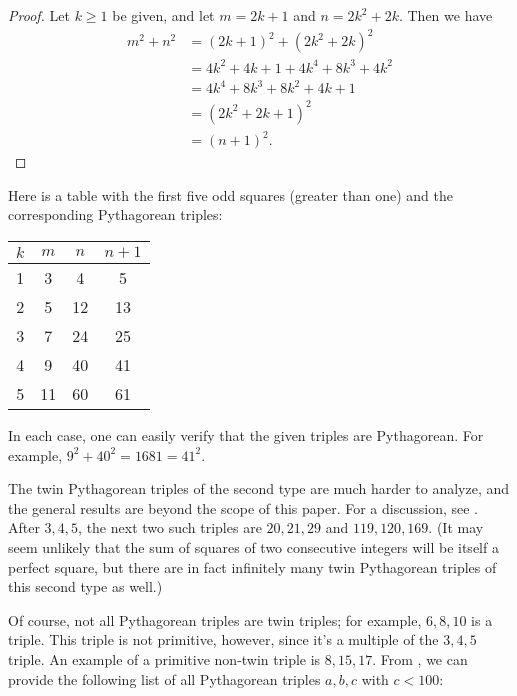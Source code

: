 \documentclass[letterpaper,12pt]{article}
\theoremstyle{definition}
\begin{document}
\begin{proof}
 Let $k\geq 1$ be given, and let $m=2k+1$ and $n=2k^2+2k$. Then we have
\begin{align*}
 m^2+n^2 & = (2k+1)^2 + (2k^2+2k)^2\\
 & = 4k^2+4k+1 +4k^4+8k^3+4k^2\\
 & = 4k^4+8k^3+8k^2+4k+1\\
 & = (2k^2+2k+1)^2\\
 & = (n+1)^2.
\end{align*}
\end{proof}
Here is a table with the first five odd squares (greater than one) and the corresponding Pythagorean triples:
\begin{center}
\begin{tabular}{|c|ccc|}
\hline
 $k$&$m$&$n$&$n+1$\\
\hline
1&3&4&5\\
2&5&12&13\\
3&7&24&25\\
4&9&40&41\\
5&11&60&61\\
\hline
\end{tabular}
\end{center}
In each case, one can easily verify that the given triples are Pythagorean. For example, $9^2+40^2 = 1681 = 41^2$.

The twin Pythagorean triples of the second type are much harder to analyze, and the general results are beyond the scope of this paper. For a discussion, see \cite{MW}. After $3,4,5$, the next two such triples are $20,21,29$ and $119, 120, 169$. (It may seem unlikely that the sum of squares of two consecutive integers will be itself a perfect square, but there are in fact infinitely many twin Pythagorean triples of this second type as well.)

Of course, not all Pythagorean triples are twin triples; for example, $6,8,10$ is a triple. This triple is not primitive, however, since it's a multiple of the $3,4,5$ triple. An example of a primitive non-twin triple is $8,15,17$. From \cite{Tsm}, we can provide the following list of all Pythagorean triples $a,b,c$ with $c<100$:
\end{document}
